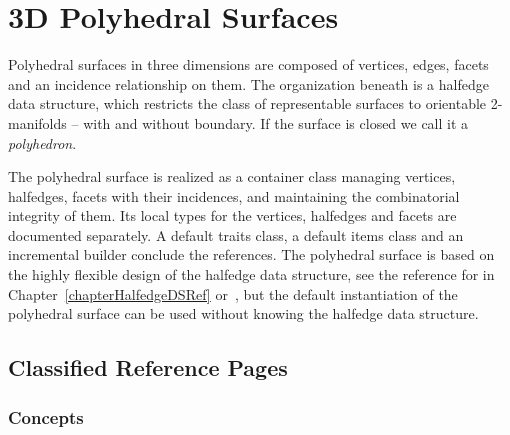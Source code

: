 
\chapter{3D Polyhedral Surfaces}
\label{chapterPolyhedronRef}



Polyhedral surfaces in three dimensions are composed of vertices,
edges, facets and an incidence relationship on them. The organization
beneath is a halfedge data structure, which restricts the class of
representable surfaces to orientable 2-manifolds -- with and without
boundary. If the surface is closed we call it a {\em polyhedron}.

The polyhedral surface is realized as a container class managing
vertices, halfedges, facets with their incidences, and maintaining the
combinatorial integrity of them. Its local types for the vertices,
halfedges and facets are documented separately.  A default traits
class, a default items class and an incremental builder conclude the
references. The polyhedral surface is based on the highly flexible
design of the halfedge data structure, see the reference for
 in Chapter~\ref{chapterHalfedgeDSRef}
or~\cite{k-ugpdd-99}, but the default instantiation of the polyhedral
surface can be used without knowing the halfedge data structure.

\section{Classified Reference Pages}

\subsection*{Concepts}

\\ 

